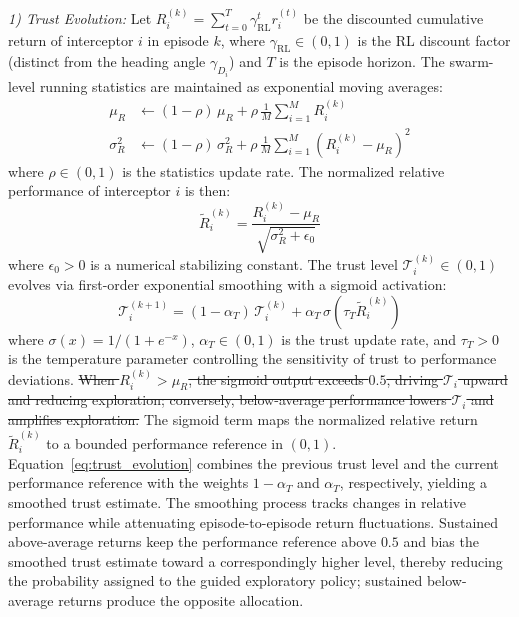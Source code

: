 \documentclass[lettersize,journal]{IEEEtran}
\newcommand{\hladd}[1]{{\color{blue}#1}}
\newcommand{\hldel}[1]{{\color{red}\sout{#1}}}
\begin{document}
\emph{1) Trust Evolution:} Let $R_i^{(k)} = \sum_{t=0}^{T} \gamma_{\mathrm{RL}}^t r_i^{(t)}$ be the discounted cumulative return of interceptor $i$ in episode $k$, where $\gamma_{\mathrm{RL}} \in (0,1)$ is the RL discount factor (distinct from the heading angle $\gamma_{D_i}$) and $T$ is the episode horizon. The swarm-level running statistics are maintained as exponential moving averages:
\begin{align}
\mu_R &\leftarrow (1-\rho)\,\mu_R + \rho\,\frac{1}{M}\sum_{i=1}^{M} R_i^{(k)} \label{eq:running_stats_mu} \\
\sigma_R^2 &\leftarrow (1-\rho)\,\sigma_R^2 + \rho\,\frac{1}{M}\sum_{i=1}^{M}\!\left(R_i^{(k)} - \mu_R\right)^2 \label{eq:running_stats_sigma}
\end{align}
where $\rho \in (0,1)$ is the statistics update rate. The normalized relative performance of interceptor $i$ is then:
\begin{equation}
\label{eq:trust_normalized}
\tilde{R}_i^{(k)} = \frac{R_i^{(k)} - \mu_R}{\sqrt{\sigma_R^2 + \epsilon_0}}
\end{equation}
where $\epsilon_0 > 0$ is a numerical stabilizing constant. The trust level $\mathcal{T}_i^{(k)} \in (0,1)$ evolves via first-order exponential smoothing with a sigmoid activation:
\begin{equation}
\label{eq:trust_evolution}
\mathcal{T}_i^{(k+1)} = (1-\alpha_T)\,\mathcal{T}_i^{(k)} + \alpha_T\,\sigma\!\left(\tau_T \tilde{R}_i^{(k)}\right)
\end{equation}
where $\sigma(x)=1/(1+e^{-x})$, $\alpha_T\in(0,1)$ is the trust update rate,
and $\tau_T>0$ is the temperature parameter controlling the sensitivity of
trust to performance deviations.
\hldel{When $R_i^{(k)}>\mu_R$, the sigmoid output exceeds $0.5$, driving
$\mathcal{T}_i$ upward and reducing exploration; conversely, below-average
performance lowers $\mathcal{T}_i$ and amplifies exploration.}
\hladd{The sigmoid term maps the normalized relative return
$\tilde{R}_i^{(k)}$ to a bounded performance reference in $(0,1)$.
Equation~\eqref{eq:trust_evolution} combines the previous trust level and
the current performance reference with the weights $1-\alpha_T$ and
$\alpha_T$, respectively, yielding a smoothed trust estimate. The
smoothing process tracks changes in relative performance while attenuating
episode-to-episode return fluctuations. Sustained above-average returns
keep the performance reference above $0.5$ and bias the smoothed trust
estimate toward a correspondingly higher level, thereby reducing the
probability assigned to the guided exploratory policy; sustained
below-average returns produce the opposite allocation.}
\end{document}
